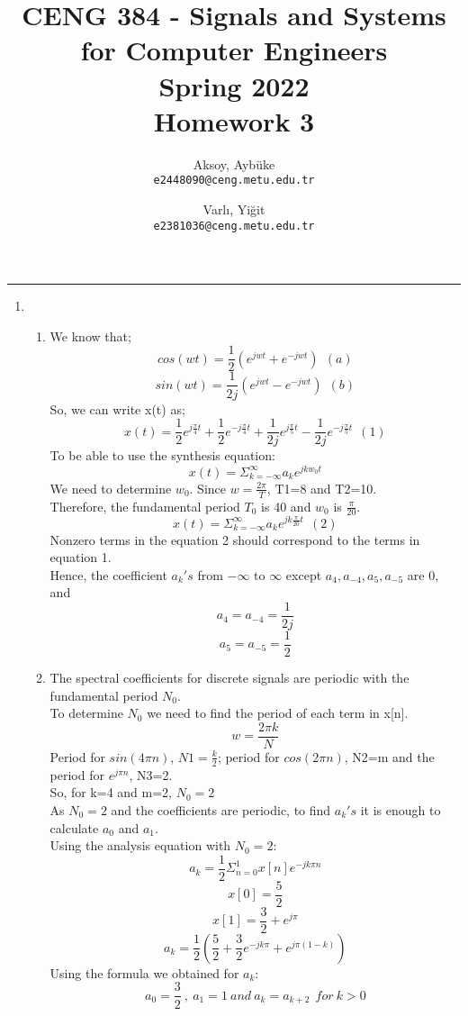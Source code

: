 \documentclass[10pt,a4paper, margin=1in]{article}
\author{
  Aksoy, Aybüke\\
  \texttt{e2448090@ceng.metu.edu.tr}
  \and
  Varlı, Yiğit\\
  \texttt{e2381036@ceng.metu.edu.tr}
}
\title{CENG 384 - Signals and Systems for Computer Engineers \\
Spring 2022 \\
Homework 3}
\begin{document}
\maketitle



\noindent\rule{19cm}{1.2pt}

\begin{enumerate}

\item %
    \begin{enumerate}
    \item %
    We know that;
    \[cos(wt)=\frac{1}{2}(e^{jwt}+e^{-jwt}) \ \ (a)\]
    \[sin(wt)=\frac{1}{2j}(e^{jwt}-e^{-jwt}) \ \ (b)\]
    So, we can write x(t) as;
    \[x(t)=\frac{1}{2}e^{j\frac{\pi}{4}t}+\frac{1}{2}e^{-j\frac{\pi}{4}t}+\frac{1}{2j}e^{j\frac{\pi}{5}t}-\frac{1}{2j}e^{-j\frac{\pi}{5}t} \ \ (1)\] 
    To be able to use the synthesis equation:
    \[x(t)=\Sigma_{k=-\infty}^{\infty}a_{k}e^{jk{w_0}t}\]
    We need to determine $w_0$.
    Since $w=\frac{2\pi}{T}$, T1=8 and T2=10.\\ 
    Therefore, the fundamental period $T_0$ is 40 and $w_0$ is $\frac{\pi}{20}.$
    \[x(t)=\Sigma_{k=-\infty}^{\infty}a_{k}e^{jk\frac{\pi}{20}t} \ \ (2)\] 
    Nonzero terms in the equation 2 should correspond to the terms in equation 1.\\
    Hence, the coefficient $a_k's$ from $-\infty$ to $\infty$ except $a_4, a_{-4}, a_5, a_{-5}$ are 0, and
    \[a_4=a_{-4}=\frac{1}{2j}\]
    \[a_5=a_{-5}=\frac{1}{2}\]
    \item %
    The spectral coefficients for discrete signals are periodic with the fundamental period $N_0$.\\
    To determine $N_0$ we need to find the period of each term in x[n]. 
    \[w=\frac{2\pi k}{N}\]
    Period for $sin(4\pi n)$, $N1=\frac{k}{2}$; period for $cos(2\pi n)$, N2=m and the period for $e^{j\pi n}$, N3=2.\\ 
    So, for k=4 and m=2, $N_0=2$\\
    As $N_0=2$ and the coefficients are periodic, to find $a_k's$ it is enough to calculate $a_0$ and $a_1$.\\
    Using the analysis equation with $N_0=2$:
    \[a_k=\frac{1}{2}\Sigma_{n=0}^{1}x[n]e^{-jk\pi n}\]
    \[x[0]=\frac{5}{2}\]
    \[x[1]=\frac{3}{2}+e^{j\pi}\]
    \[a_k=\frac{1}{2}(\frac{5}{2}+\frac{3}{2}e^{-jk\pi}+e^{j \pi(1-k)})\]
    Using the formula we obtained for $a_k$:
    \[a_0=\frac{3}{2} \ , \ a_1=1 \ and \ a_k=a_{k+2} \ \ for \ k>0\]
    \end{enumerate}


\end{enumerate}
\end{document}
